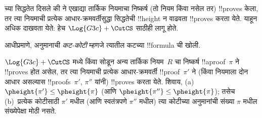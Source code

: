 \documentclass[../../../include/open-logic-section]{subfiles}
\begin{document}


 च्या सिद्धतेत दिसले
की  ने एखाद्या तार्किक नियमाचा निष्कर्ष
(तो नियम \RightR{\lexists} किंवा \LeftR{\lforall}
नसेल तर) !!{prove}s केला, तर त्या नियमाची प्रत्येक
आधार-क्रमवर्तीसुद्धा सिद्धतेची !!{height} न वाढवता
!!{prove}s करता येते. याहून अधिक दाखवता येते:
हेच $\Log{G3c} + \CutCS$ साठीही लागू होते.

आधीप्रमाणे, \CutCS{} अनुमानाची \emph{कट-कोटी}
म्हणजे त्यातील कटच्या !!{formula} ची खोली.

\begin{lem}
$\Log{G3c} + \CutCS$ मध्ये \RightR{\lexists}
किंवा \LeftR{\lforall} सोडून अन्य तार्किक नियम~$R$
चा निष्कर्ष !!a{proof}~$\pi$ ने !!{prove}s होत असेल,
तर त्या नियमाची प्रत्येक आधार-क्रमवर्ती
!!{proof}~$\pi'$ ने (किंवा नियमाला दोन आधार
असल्यास !!{proof}s~$\pi'$, $\pi''$ यांनी)
!!{prove}s करता येते. शिवाय,
(a)~$\pheight{\pi'}\le\pheight{\pi}$ (आणि
$\pheight{\pi''}\le\pheight{\pi}$);
तसेच (b)~प्रत्येक कोटीसाठी $\pi'$ मधील
(आणि स्वतंत्रपणे $\pi''$ मधील) त्या कोटीच्या
\CutCS{} अनुमानांची संख्या $\pi$ मधील संख्येपेक्षा
मोठी नसते.
\end{lem}
\end{document}
